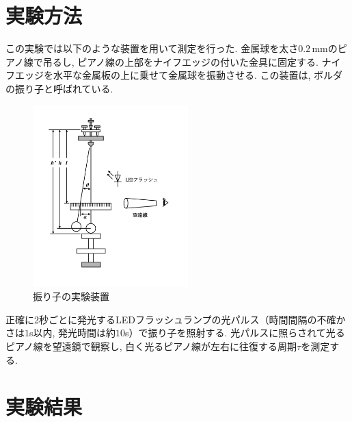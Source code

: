 \documentclass{jarticle}
\begin{document}
\section{実験方法}

この実験では以下のような装置を用いて測定を行った.
金属球を太さ$0.2\,\mathrm{mm}$のピアノ線で吊るし, ピアノ線の上部をナイフエッジの付いた金具に固定する.
ナイフエッジを水平な金属板の上に乗せて金属球を振動させる.
この装置は, ボルダの振り子と呼ばれている.

\begin{figure}[H]
  \begin{center}
  \includegraphics[width=60mm]{experimental_method_picture.png}
  \caption{振り子の実験装置}
  \end{center}
\end{figure}

正確に2秒ごとに発光するLEDフラッシュランプの光パルス（時間間隔の不確かさは$1$\textmu s以内, 発光時間は約$10$\textmu s）で振り子を照射する.
光パルスに照らされて光るピアノ線を望遠鏡で観察し, 白く光るピアノ線が左右に往復する周期$\tau$を測定する.


\section{実験結果}
\end{document}
